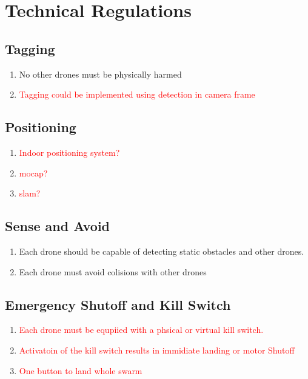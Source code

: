 
\newpage
\section{Technical Regulations}
\subsection{Tagging}
\begin{enumerate}
	\item{No other drones must be physically harmed}
	\item{\textcolor{red}{Tagging could be implemented using detection in camera frame}}
\end{enumerate}

\subsection{Positioning}
\begin{enumerate}
	\item{\textcolor{red}{Indoor positioning system?}}
	\item{\textcolor{red}{mocap?}}
	\item{\textcolor{red}{slam?}}

\end{enumerate}

\subsection{Sense and Avoid}
\begin{enumerate}
	\item{Each drone should be capable of detecting static obstacles and other drones.}
	\item{Each drone must avoid colisions with other drones}
\end{enumerate}

\subsection{Emergency Shutoff and Kill Switch}
\begin{enumerate}
	\item{\textcolor{red}{Each drone must be equpiied with a phsical or virtual kill switch.}}
	\item{\textcolor{red}{Activatoin of the kill switch results in immidiate landing or motor Shutoff}}
	\item{\textcolor{red}{One button to land whole swarm}}
\end{enumerate}

